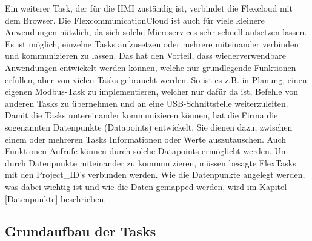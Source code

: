 Ein weiterer Task, der für die HMI zuständig ist, verbindet die Flexcloud mit dem Browser. Die FlexcommunicationCloud ist auch für viele kleinere Anwendungen nützlich, da sich solche Microservices sehr schnell aufsetzen lassen. Es ist möglich, einzelne Tasks aufzusetzen oder mehrere miteinander verbinden und kommunizieren zu lassen. Das hat den Vorteil, dass wiederverwendbare Anwendungen entwickelt werden können, welche nur grundlegende Funktionen erfüllen, aber von vielen Tasks gebraucht werden. So ist es z.B. in Planung, einen eigenen Modbus-Task zu implementieren, welcher nur dafür da ist, Befehle von anderen Tasks zu übernehmen und an eine USB-Schnittstelle weiterzuleiten.
Damit die Tasks untereinander kommunizieren können, hat die Firma die sogenannten Datenpunkte (Datapoints) entwickelt. Sie dienen dazu, zwischen einem oder mehreren Tasks Informationen oder Werte auszutauschen. Auch Funktionen-Aufrufe können durch solche Datapoints ermöglicht werden. Um durch Datenpunkte miteinander zu kommunizieren, müssen besagte FlexTasks mit den Project\_ID's verbunden werden.
Wie die Datenpunkte angelegt werden, was dabei wichtig ist und wie die Daten gemapped werden, wird im Kapitel \ref{Datenpunkte} beschrieben.
\subsection{Grundaufbau der Tasks}


